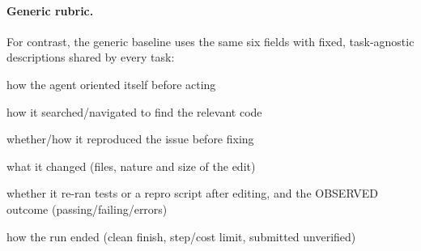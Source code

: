 \documentclass{article}
\begin{document}
\paragraph{Generic rubric.} For contrast, the generic baseline uses the same six fields with fixed, task-agnostic descriptions shared by every task:
\begin{description}[itemsep=1pt, topsep=2pt]\small
\item[understanding] how the agent oriented itself before acting
\item[localization] how it searched/navigated to find the relevant code
\item[reproduction] whether/how it reproduced the issue before fixing
\item[editing] what it changed (files, nature and size of the edit)
\item[verification] whether it re-ran tests or a repro script after editing, and the OBSERVED outcome (passing/failing/errors)
\item[final state] how the run ended (clean finish, step/cost limit, submitted unverified)
\end{description}
\end{document}
